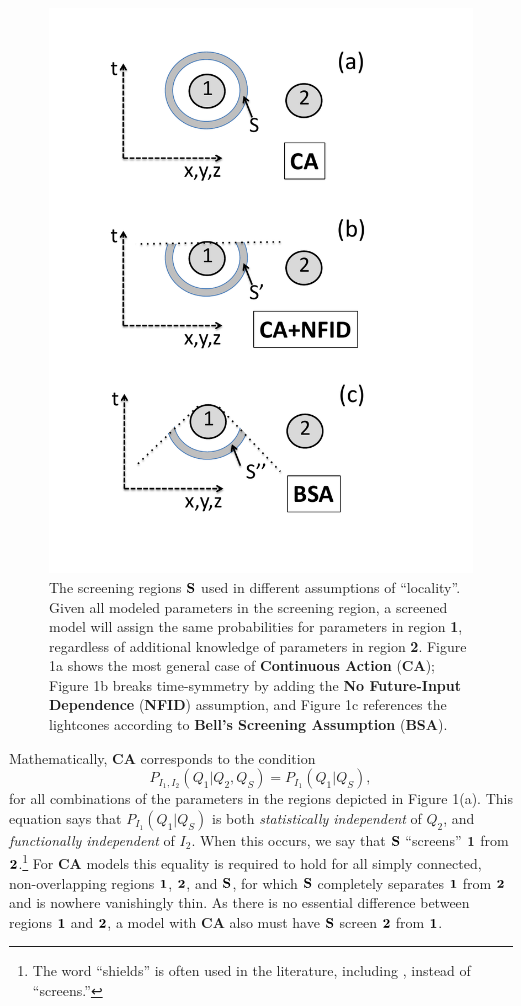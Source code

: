 \documentclass[onecolumn, nofootinbib, 12pt]{revtex4-1}
\begin{document}
\begin{figure}[t]%
\centerline{\includegraphics[width=.5\textwidth]{Figure1.pdf}}
\label{Figure:Fig1}
\caption{The screening regions $\bf{S}$ used in different assumptions of ``locality''.  Given all modeled parameters in the screening region, a screened model will assign the same probabilities for parameters in region {\bf 1}, regardless of  additional knowledge of parameters in region {\bf 2}.  Figure 1a shows the most general case of {\bf Continuous Action} ({\bf CA}); Figure 1b breaks time-symmetry by adding the {\bf No Future-Input Dependence} ({\bf NFID}) assumption, and Figure 1c references the lightcones according to {\bf Bell's Screening Assumption} ({\bf BSA}).}
\end{figure}

Mathematically, {\bf CA} corresponds to the condition
\begin{equation}
\label{eq:shield_full}
P_{I_1,I_2}(Q_1|Q_2,Q_S) = P_{I_1}(Q_1|Q_S),
\end{equation}
for all combinations of the parameters in the regions depicted in Figure 1(a).  This equation says that $P_{I_1}(Q_1|Q_S)$ is both {\em statistically independent} of $Q_2$, and {\em functionally independent} of $I_2$.  When this occurs, we say that $\bf{S}$ ``screens'' $\bf{1}$ from $\bf{2}$.\footnote{The word ``shields'' is often used in the literature, including \textcite{bell1990}, instead of ``screens.''}  For {\bf CA} models this equality is required to hold for all simply connected, non-overlapping regions $\bf{1}$, $\bf{2}$, and $\bf{S}$, for which $\bf{S}$ completely separates $\bf{1}$ from $\bf{2}$ and is nowhere vanishingly thin.  As there is no essential difference between regions $\bf{1}$ and $\bf{2}$, a model with {\bf CA} also must have $\bf{S}$ screen $\bf{2}$ from $\bf{1}$.
\end{document}
